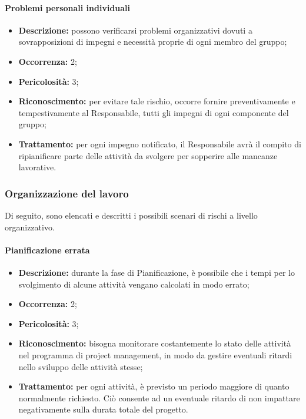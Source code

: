 \paragraph{Problemi personali individuali}
\begin{itemize}
	\item \textbf{Descrizione:} possono verificarsi problemi organizzativi dovuti a sovrapposizioni di impegni e necessità proprie di ogni membro del gruppo;
	\item \textbf{Occorrenza:} 2;
	\item \textbf{Pericolosità:} 3;
	\item \textbf{Riconoscimento:} per evitare tale rischio, occorre fornire preventivamente e tempestivamente al Responsabile, tutti gli impegni di ogni componente del gruppo;
	\item \textbf{Trattamento:} per ogni impegno notificato, il Responsabile avrà il compito di ripianificare parte delle attività da svolgere per sopperire alle mancanze lavorative.
\end{itemize}

\subsubsection{Organizzazione del lavoro}

Di seguito, sono elencati e descritti i possibili scenari di rischi a livello organizzativo.

\paragraph{Pianificazione errata}
\begin{itemize}
	\item \textbf{Descrizione:} durante la fase di Pianificazione, è possibile che i tempi per lo svolgimento di alcune attività vengano calcolati in modo errato;
	\item \textbf{Occorrenza:} 2;
	\item \textbf{Pericolosità:} 3;
	\item \textbf{Riconoscimento:} bisogna monitorare costantemente lo stato delle attività nel programma di project management, in modo da gestire eventuali ritardi nello sviluppo delle attività stesse;
	\item \textbf{Trattamento:} per ogni attività, è previsto un periodo maggiore di quanto normalmente richiesto. Ciò consente ad un eventuale ritardo di non impattare negativamente sulla durata totale del progetto.
\end{itemize}

